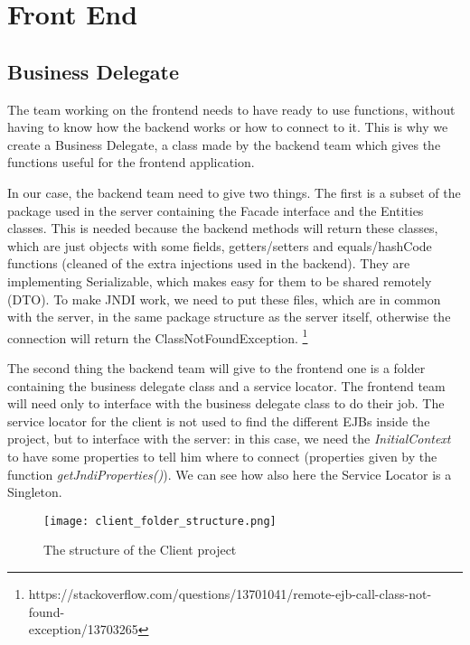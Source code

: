 \pagebreak
\section{Front End}
\subsection{Business Delegate}

The team working on the frontend needs to have ready to use functions, without having to know how the backend works or how to connect to it. This is why we create a Business Delegate, a class made by the backend team which gives the functions useful for the frontend application.

In our case, the backend team need to give two things. The first is a subset of the package used in the server containing the Facade interface and the Entities classes. This is needed because the backend methods will return these classes, which are just objects with some fields, getters/setters and equals/hashCode functions (cleaned of the extra injections used in the backend). They are implementing Serializable, which makes easy for them to be shared remotely (DTO). To make JNDI work, we need to put these files, which are in common with the server, in the same package structure as the server itself, otherwise the connection will return the ClassNotFoundException. 
\footnote{https://stackoverflow.com/questions/13701041/remote-ejb-call-class-not-found-\\exception/13703265}

The second thing the backend team will give to the frontend one is a folder containing the business delegate class and a service locator. The frontend team will need only to interface with the business delegate class to do their job. The service locator for the client is not used to find the different EJBs inside the project, but to interface with the server: in this case, we need the \textit{InitialContext} to have some properties to tell him where to connect (properties given by the function \textit{getJndiProperties()}). We can see how also here the Service Locator is a Singleton.

\begin{figure}[H]
  \centering
  \texttt{[image: client\_folder\_structure.png]}
  \caption{The structure of the Client project}
\end{figure}

